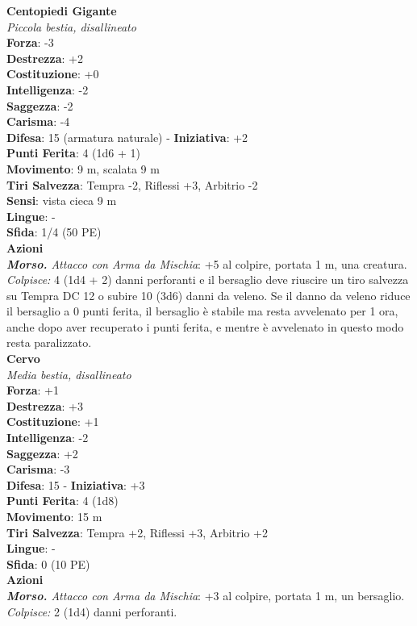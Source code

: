 \begin{multicols}{2}
\medskip\textbf{Centopiedi Gigante}\\
\emph{Piccola bestia, disallineato}\\
\textbf{Forza}: -3\\
\textbf{Destrezza}: +2\\
\textbf{Costituzione}: +0\\
\textbf{Intelligenza}: -2\\
\textbf{Saggezza}: -2\\
\textbf{Carisma}: -4\\
\textbf{Difesa}: 15 (armatura naturale) - \textbf{Iniziativa}: +2\\
\textbf{Punti Ferita}: 4 (1d6 + 1)\\
\textbf{Movimento}: 9 m, scalata 9 m\\
\textbf{Tiri Salvezza}: Tempra -2, Riflessi +3, Arbitrio -2 \\
\textbf{Sensi}: vista cieca 9 m\\
\textbf{Lingue}: -\\
\textbf{Sfida}: 1/4 (50 PE)\smallskip\\
\smallskip\textbf{Azioni}\\
\emph{\textbf{Morso.} Attacco con Arma da Mischia}: +5 al colpire, portata 1 m, una creatura.\\
\emph{Colpisce:} 4 (1d4 + 2) danni perforanti e il bersaglio deve riuscire un tiro salvezza su Tempra DC  12 o subire 10 (3d6) danni da veleno. Se il danno da veleno riduce il bersaglio a 0 punti ferita, il bersaglio è stabile ma resta avvelenato per 1 ora, anche dopo aver recuperato i punti ferita, e mentre è avvelenato in questo modo resta paralizzato.\\

\medskip\textbf{Cervo}\\
\emph{Media bestia, disallineato}\\
\textbf{Forza}: +1\\
\textbf{Destrezza}: +3\\
\textbf{Costituzione}: +1\\
\textbf{Intelligenza}: -2\\
\textbf{Saggezza}: +2\\
\textbf{Carisma}: -3\\
\textbf{Difesa}: 15 - \textbf{Iniziativa}: +3\\
\textbf{Punti Ferita}: 4 (1d8)\\
\textbf{Movimento}: 15 m\\
\textbf{Tiri Salvezza}: Tempra +2, Riflessi +3, Arbitrio +2 \\
\textbf{Lingue}: -\\
\textbf{Sfida}: 0 (10 PE)\smallskip\\
\smallskip\textbf{Azioni}\\
\emph{\textbf{Morso.} Attacco con Arma da Mischia}: +3 al colpire, portata 1 m, un bersaglio.\\
\emph{Colpisce:} 2 (1d4) danni perforanti.\\


\end{multicols}
